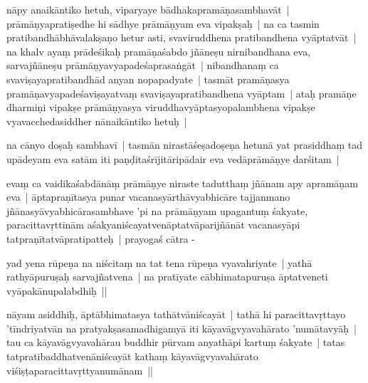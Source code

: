 \documentclass[article,12pt,a4paper]{memoir}%
\newcounter{parCount}
\begin{document}
	  
	  \pstart \leavevmode%
	\label{thakur75-101.9}nāpy anaikāntiko hetuh, viparyaye bādhakapramāṇasambhavāt | prāmāṇyapratiṣedhe hi sādhye prāmāṇyam eva vipakṣaḥ | na ca tasmin pratibandhābhāvalakṣaṇo hetur asti, svaviruddhena pratibandhena vyāptatvāt | na khalv ayaṃ prādeśikaḥ pramāṇaśabdo jñāneṣu nirnibandhana eva, sarvajñāneṣu prāmāṇyavyapadeśaprasaṅgāt | nibandhanaṃ ca svaviṣayapratibandhād anyan nopapadyate | tasmāt pramāṇasya pramāṇavyapadeśaviṣayatvaṃ svaviṣayapratibandhena vyāptam | ataḥ pramāṇe dharmiṇi vipakṣe prāmāṇyasya viruddhavyāptasyopalambhena vipakṣe vyavacchedasiddher nānaikāntiko hetuḥ |
	{}
	\pend%
      

	  
	  \pstart \leavevmode%
	\label{thakur75-101.16}na cānyo doṣaḥ sambhavī | tasmān nirastāśeṣadoṣeṇa hetunā yat prasiddhaṃ tad upādeyam eva satām iti paṇḍitaśrījitāripādair eva vedāprāmāṇye darśitam | 
	{}
	\pend%
      

	  
	  \pstart \leavevmode%
	\label{thakur75-101.18}evaṃ ca vaidikaśabdānāṃ prāmāṇye niraste tadutthaṃ jñānam apy apramāṇam eva | āptapraṇītasya punar vacanasyārthāvyabhicāre tajjanmano jñānasyāvyabhicārasambhave 'pi na prāmāṇyam upagantuṃ śakyate, paracittavṛttīnām aśakyaniścayatvenāptatvāparijñānāt vacanasyāpi tatpraṇītatvāpratipatteḥ | prayogaś cātra -
	{}
	\pend%
      

	  
	  \pstart \leavevmode%
	\label{thakur75-101.22}yad yena rūpeṇa na niścitaṃ na tat tena rūpeṇa vyavahriyate | yathā rathyāpuruṣaḥ sarvajñatvena | na pratīyate cābhimatapuruṣa āptatveneti vyāpakānupalabdhiḥ || 
	{}
	\pend%
      

	  
	  \pstart \leavevmode%
	\label{thakur75-101.24}nāyam asiddhiḥ, āptābhimatasya tathātvāniścayāt | tathā hi paracittavṛttayo 'tīndriyatvān na pratyakṣasamadhigamyā iti kāyavāgvyavahārato 'numātavyāḥ | tau ca kāyavāgvyavahārau buddhir pūrvam anyathāpi kartuṃ śakyate | tatas tatpratibaddhatvenāniścayāt kathaṃ kāyavāgvyavahārato viśiṣṭaparacittavṛttyanumānam ||
	{}
	\pend%
      
\end{document}
